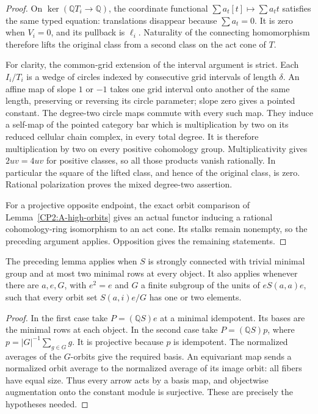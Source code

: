 \begin{proof}
On $\ker(\mathbb QT_i\to\mathbb Q)$, the coordinate
functional $\sum a_t[t]\mapsto\sum a_t t$ satisfies
the same typed equation: translations disappear because
$\sum a_t=0$.  It is zero when $V_i=0$, and its pullback
is $\ell_i$.  Naturality of the connecting homomorphism
therefore lifts the original class from a second class
on the act cone of $T$.

For clarity, the common-grid extension of the interval
argument is strict.  Each $I_i/T_i$ is a wedge of circles
indexed by consecutive grid intervals of length $\delta$.
An affine map of slope $1$ or $-1$ takes one grid interval
onto another of the same length, preserving or reversing
its circle parameter; slope zero gives a pointed constant.
The degree-two circle maps commute with every such map.
They induce a self-map of the pointed category bar which
is multiplication by two on its reduced cellular chain
complex, in every total degree.  It is therefore
multiplication by two on every positive cohomology group.
Multiplicativity gives $2uv=4uv$ for positive classes,
so all those products vanish rationally.  In particular
the square of the lifted class, and hence of the original
class, is zero.  Rational polarization proves the mixed
degree-two assertion.

For a projective opposite endpoint, the exact orbit
comparison of Lemma~\ref{CP2:A-high-orbits} gives an
actual functor inducing a rational cohomology-ring
isomorphism to an act cone.  Its stalks remain nonempty,
so the preceding argument applies.  Opposition gives
the remaining statements.
\end{proof}

\begin{corollary}
\label{CP2:A-baseline-two-row-instances}
The preceding lemma applies when $S$ is strongly connected
with trivial minimal group and at most two minimal rows
at every object.  It also applies whenever there are
$a,e,G$, with $e^2=e$ and $G$ a finite subgroup of the
units of $eS(a,a)e$, such that every orbit set
$S(a,i)e/G$ has one or two elements.
\end{corollary}
\begin{proof}
In the first case take $P=(\mathbb QS)e$ at a minimal
idempotent.  Its bases are the minimal rows at each object.
In the second case take
$P=(\mathbb QS)p$, where $p=|G|^{-1}\sum_{g\in G}g$.
It is projective because $p$ is idempotent.  The normalized
averages of the $G$-orbits give the required basis.  An
equivariant map sends a normalized orbit average to the
normalized average of its image orbit: all fibers have
equal size.  Thus every arrow acts by a basis map, and
objectwise augmentation onto the constant module is
surjective.  These are precisely the hypotheses needed.
\end{proof}

